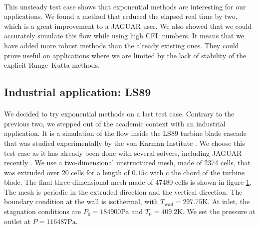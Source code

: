       \paragraph{}
      This unsteady test case shows that exponential methods are interesting for our applications.
      We found a method that reduced the elapsed real time by two, which is a great improvement to a JAGUAR user.
      We also showed that we could accurately simulate this flow while using high CFL numbers.
      It means that we have added more robust methods than the already existing ones.
      They could prove useful on applications where we are limited by the lack of stability of the explicit Runge--Kutta methods.


    \subsection{Industrial application: LS89}

      \paragraph{}
      We decided to try exponential methods on a last test case.
      Contrary to the previous two, we stepped out of the academic context with an industrial application.
      It is a simulation of the flow inside the LS89 turbine blade cascade that was studied experimentally by the von Karman Institute \cite{ArtsLambertdeRouvroit1992}.
      We choose this test case as it has already been done with several solvers, including JAGUAR recently \cite{BrunetCronerMinotEtAl2018}.
      We use a two-dimensional unstructured mesh, made of \num{2374} cells, that was extruded over 20 cells for a length of $0.15 c$ with $c$ the chord of the turbine blade.
      The final three-dimensional mesh made of \num{47480} cells is shown in figure \ref{fig:ls89_mesh}.
      The mesh is periodic in the extruded direction and the vertical direction.
      The boundary condition at the wall is isothermal, with $T_\textrm{wall} = 297.75 \si{\kelvin}$.
      At inlet, the stagnation conditions are $P_0 = \num{184900}\si{\pascal}$ and $T_0 = 409.2\si{\kelvin}$.
      We set the pressure at outlet at $P = \num{116487}\si{\pascal}$.


      \begin{figure}
        \centering
        \caption{}
        \label{fig:ls89_mesh}
      \end{figure}
